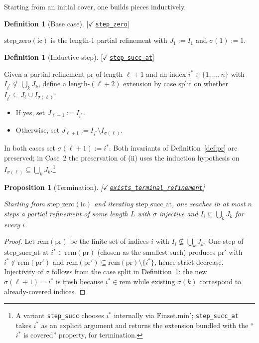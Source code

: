 \documentclass[11pt,reqno]{amsart}
\newtheorem{proposition}[theorem]{Proposition}
\theoremstyle{definition}
\newtheorem{definition}[theorem]{Definition}
\newcommand{\leanrepo}{https://github.com/MathNetwork/comb_arg/blob/v0.1.0/CombArg}
\newcommand{\leanmargin}[2]{%
  \nopagebreak\hfill{\normalfont\small\color{leangreen}%
    [\ensuremath{\checkmark}\,\href{\leanrepo/#2}{\texttt{#1}}]}\par\nopagebreak
}
\begin{document}
Starting from an initial cover, one builds pieces inductively.

\begin{definition}[Base case]
\label{def:step0}
\leanmargin{step\_zero}{Refinement/PartialRefinement.lean}
$\mathrm{step\_zero}(\mathrm{ic})$ is the length-$1$ partial
refinement with
$J_1 := I_1$ and $\sigma(1) := 1$.
\end{definition}

\begin{definition}[Inductive step]
\label{def:step-succ}
\leanmargin{step\_succ\_at}{Refinement/Induction.lean}
Given a partial refinement $\mathrm{pr}$ of length $\ell+1$ and
an index $i^* \in \{1,\ldots,n\}$ with
$I_{i^*} \not\subseteq \bigcup_k J_k$, define a length-$(\ell+2)$
extension by case split on whether
$I_{i^*} \subseteq J_\ell \cup I_{\sigma(\ell)}$:

\begin{itemize}
\item[(Case 1)] If yes, set $J_{\ell+1} := I_{i^*}$.
\item[(Case 2)] Otherwise, set
  $J_{\ell+1} := I_{i^*} \setminus I_{\sigma(\ell)}$.
\end{itemize}

In both cases set $\sigma(\ell+1) := i^*$. Both invariants of
Definition~\ref{def:pr} are preserved; in Case~2 the preservation
of (ii) uses the induction hypothesis on
$I_{\sigma(\ell)} \subseteq \bigcup_k J_k$.\footnote{A variant
\texttt{step\_succ} chooses $i^*$ internally via
$\mathrm{Finset.min'}$; \texttt{step\_succ\_at} takes $i^*$ as an
explicit argument and returns the extension bundled with the
``$i^*$ is covered'' property, for termination.}
\end{definition}

\begin{proposition}[Termination]
\label{prop:exists-terminal}
\leanmargin{exists\_terminal\_refinement}{Refinement/Induction.lean}
Starting from $\mathrm{step\_zero}(\mathrm{ic})$ and iterating
$\mathrm{step\_succ\_at}$, one reaches in at most $n$ steps a
partial refinement of some length $L$ with $\sigma$ injective
and $I_i \subseteq \bigcup_k J_k$ for every $i$.
\end{proposition}

\begin{proof}
Let $\mathrm{rem}(\mathrm{pr})$ be the finite set of indices
$i$ with $I_i \not\subseteq \bigcup_k J_k$. One step of
$\mathrm{step\_succ\_at}$ at $i^* \in \mathrm{rem}(\mathrm{pr})$
(chosen as the smallest such) produces $\mathrm{pr}'$ with
$i^* \notin \mathrm{rem}(\mathrm{pr}')$ and
$\mathrm{rem}(\mathrm{pr}') \subseteq \mathrm{rem}(\mathrm{pr})
\setminus \{i^*\}$, hence strict decrease. Injectivity of
$\sigma$ follows from the case split in
Definition~\ref{def:step-succ}: the new $\sigma(\ell+1) = i^*$
is fresh because $i^* \in \mathrm{rem}$ while existing
$\sigma(k)$ correspond to already-covered indices.
\end{proof}
\end{document}
